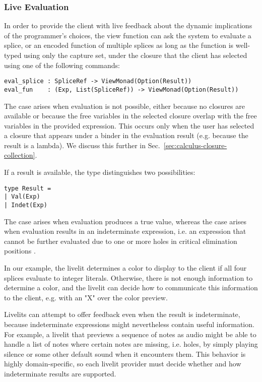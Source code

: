 \subsubsection{Live Evaluation}
In order to provide the client with live feedback about the dynamic implications 
of the programmer's choices, 
the view function can ask the system to evaluate a splice, or an encoded function of 
multiple splices as long as the function is well-typed using only the capture set, 
under the closure that the client has selected using one of the following
commands:
\begin{lstlisting}[numbers=none]
eval_splice : SpliceRef -> ViewMonad(Option(Result))
eval_fun    : (Exp, List(SpliceRef)) -> ViewMonad(Option(Result))
\end{lstlisting}

The  case 
arises when evaluation is not possible, either because no closures are available
or because the free variables in the selected closure overlap with the free 
variables in the provided expression. This occurs only when the user has selected
a closure that appears under a binder in the evaluation result (e.g. because 
the result is a lambda). 
We discuss this further in Sec.~\ref{sec:calculus-closure-collection}.

If a result is available, the  type distinguishes two possibilities:
\begin{lstlisting}[numbers=none]
type Result = 
| Val(Exp)
| Indet(Exp)
\end{lstlisting}
The  case arises when evaluation produces a true value, whereas the 
 case arises when evaluation results in an indeterminate expression,
i.e. an expression that cannot be further evaluated due to one or more holes 
in critical elimination positions \cite{HazelnutLive}.

In our example, the livelit determines a color to display to the client 
if all four splices evaluate to integer literals. Otherwise, there is not 
enough information to determine a color, and the livelit can decide how to 
communicate this information to the client, e.g. with an "X" over the color 
preview.

Livelits can attempt to offer feedback even when the result is indeterminate,
because indeterminate expressions might nevertheless contain useful information.
For example, a livelit that previews a sequence of notes as audio might be able 
to handle a list of notes where certain notes are missing, i.e. holes, by 
simply playing silence or some other default sound when it encounters them.
This behavior is highly domain-specific, so each livelit provider must decide 
whether and how indeterminate results are supported.

